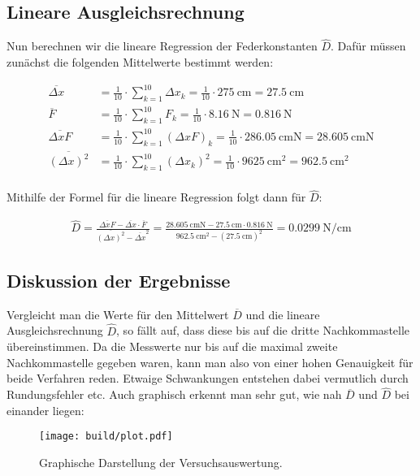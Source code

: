 \subsection{Lineare Ausgleichsrechnung}
Nun berechnen wir die lineare Regression der Federkonstanten $\hat{D}$.
Dafür müssen zunächst die folgenden Mittelwerte bestimmt werden:

\begin{align}
\nonumber    \overline{\Delta x} &=\frac{1}{10} \cdot \sum_{k=1}^{10} \Delta x_k = \frac{1}{10} \cdot \qty{275}{\cm} = \qty{27.5}{\cm} \\
\nonumber    \overline{F} &=\frac{1}{10} \cdot \sum_{k=1}^{10} F_k = \frac{1}{10} \cdot \qty{8.16}{\newton}= \qty{0.816}{\newton} \\
\nonumber    \overline{\Delta x F} &=\frac{1}{10} \cdot \sum_{k=1}^{10} \left(\Delta x F\right)_k = \frac{1}{10} \cdot \qty{286.05}{\cm\newton}= \qty{28.605}{\cm\newton} \\
\nonumber    \overline{\left(\Delta x\right)^2} &=\frac{1}{10} \cdot \sum_{k=1}^{10} \left(\Delta x_k\right)^2 = \frac{1}{10} \cdot \qty{9625}{\cm^2}= \qty{962.5}{\cm^2} \\
\end{align}


Mithilfe der Formel für die lineare Regression folgt dann für $\hat{D}$:

\begin{align}
    \hat{D} = \frac{\overline{\Delta x F} - \overline{\Delta x} \cdot \overline{F}}{\overline{\left(\Delta x\right)^2} - {\overline{\Delta x}}^2}
    = \frac{\qty{28.605}{\cm\newton} - \qty{27.5}{\cm} \cdot \qty{0.816}{\newton}}{\qty{962.5}{\cm^2} - \left({\qty{27.5}{\cm}}\right)^2}
    = \qty[]{0.0299}{\newton\per\cm}
\end{align}

\subsection{Diskussion der Ergebnisse}
Vergleicht man die Werte für den Mittelwert $\overline{D}$ und die lineare Ausgleichsrechnung $\hat{D}$, so fällt auf, 
dass diese bis auf die dritte Nachkommastelle übereinstimmen.   
Da die Messwerte nur bis auf die maximal zweite Nachkommastelle gegeben waren,
kann man also von einer hohen Genauigkeit für beide Verfahren reden. 
Etwaige Schwankungen entstehen dabei vermutlich durch Rundungsfehler etc.
Auch graphisch erkennt man sehr gut, wie nah $\overline{D}$ und $\hat{D}$ bei einander liegen:

\begin{figure}
    \centering
        \texttt{[image: build/plot.pdf]}
    \caption{Graphische Darstellung der Versuchsauswertung.}
    \label{fig:plot}
    \end{figure}
    

